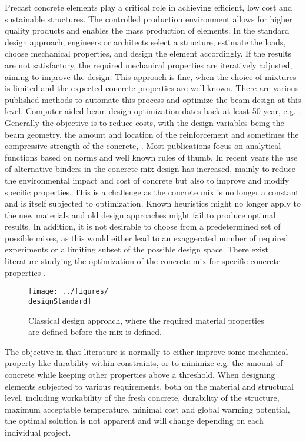 Precast concrete elements play a critical role in achieving efficient, low cost and sustainable structures.
The controlled production environment allows for higher quality products and enables the mass production of elements.
In the standard design approach, engineers or architects select a structure, estimate the loads, choose mechanical properties, and design the element accordingly. 
If the results are not satisfactory, the required mechanical properties are iteratively adjusted, aiming to improve the design.
This approach is fine, when the choice of mixtures is limited and the expected concrete properties are well known.
There are various published methods to automate this process and optimize the beam design at this level.
Computer aided beam design optimization dates back at least 50 year, e.g. \cite{Haung1967}.
Generally the objective is to reduce costs, with the design variables being the beam geometry, the amount and location of the reinforcement and sometimes the compressive strength of the concrete, \cite{Chakrabarty_1992, Coello_1997, Pierott_2021, Shobeiri_2023} .
Most publications focus on analytical functions based on norms and well known rules of thumb.
In recent years the use of alternative binders in the concrete mix design has increased, mainly to reduce the environmental impact and cost of concrete but also to improve and modify specific properties.
This is a challenge as the concrete mix is no longer a constant and is itself subjected to optimization.
Known heuristics might no longer apply to the new materials and old design approaches might fail to produce optimal results.
In addition, it is not desirable to choose from a predetermined set of possible mixes, as this would either lead to an exaggerated number of required experiments or a limiting subset of the possible design space.
There exist literature studying the optimization of the concrete mix for specific concrete properties \cite{Lisienkova_2021, Kondapally_2022}.
\begin{figure}[b]%
	\centering
	\texttt{[image: ../figures/\\designStandard]}
	\caption{Classical design approach, where the required material properties are defined before the mix is defined.}\label{fig:standard_design}
\end{figure}
The objective in that literature is normally to either improve some mechanical property like durability within constraints, or to minimize e.g. the amount of concrete while keeping other properties above a threshold.
When designing elements subjected to various requirements, both on the material and structural level, including workability of the fresh concrete, durability of the structure, maximum acceptable temperature, minimal cost and global warming potential, the optimal solution is not apparent and will change depending on each individual project.
